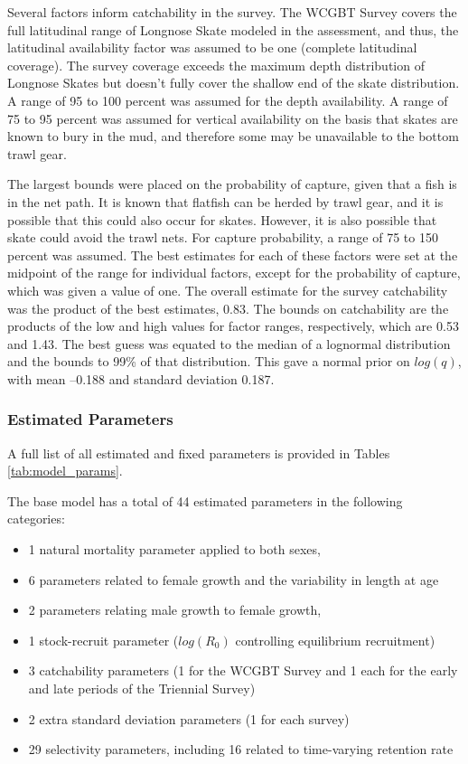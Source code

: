 \documentclass[12pt,]{article}
\begin{document}
Several factors inform catchability in the survey. The WCGBT Survey
covers the full latitudinal range of Longnose Skate modeled in the
assessment, and thus, the latitudinal availability factor was assumed to
be one (complete latitudinal coverage). The survey coverage exceeds the
maximum depth distribution of Longnose Skates but doesn't fully cover
the shallow end of the skate distribution. A range of 95 to 100 percent
was assumed for the depth availability. A range of 75 to 95 percent was
assumed for vertical availability on the basis that skates are known to
bury in the mud, and therefore some may be unavailable to the bottom
trawl gear.

The largest bounds were placed on the probability of capture, given that
a fish is in the net path. It is known that flatfish can be herded by
trawl gear, and it is possible that this could also occur for skates.
However, it is also possible that skate could avoid the trawl nets. For
capture probability, a range of 75 to 150 percent was assumed. The best
estimates for each of these factors were set at the midpoint of the
range for individual factors, except for the probability of capture,
which was given a value of one. The overall estimate for the survey
catchability was the product of the best estimates, 0.83. The bounds on
catchability are the products of the low and high values for factor
ranges, respectively, which are 0.53 and 1.43. The best guess was
equated to the median of a lognormal distribution and the bounds to 99\%
of that distribution. This gave a normal prior on \(log(q)\), with mean
--0.188 and standard deviation 0.187.

\hypertarget{estimated-parameters}{%
\subsubsection{Estimated Parameters}\label{estimated-parameters}}

A full list of all estimated and fixed parameters is provided in Tables
\ref{tab:model_params}.

The base model has a total of 44 estimated parameters in the following
categories:

\begin{itemize}
  \item 1 natural mortality parameter applied to both sexes,
  \item 6 parameters related to female growth and the variability in length at age
  \item 2 parameters relating male growth to female growth,
  \item 1 stock-recruit parameter ($log(R_0)$ controlling equilibrium recruitment)
  \item 3 catchability parameters (1 for the WCGBT Survey and 1 each for the early and late periods of the Triennial Survey)
  \item 2 extra standard deviation parameters (1 for each survey)
  \item 29 selectivity parameters, including 16 related to time-varying retention rate
\end{itemize}
\end{document}

